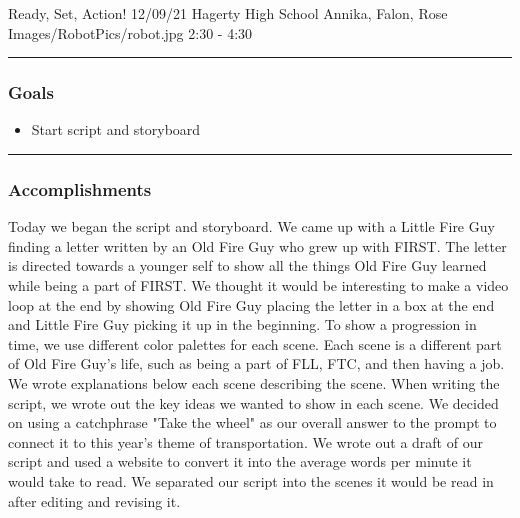 \insertmeeting 
	{Ready, Set, Action!} 
	{12/09/21} 
	{Hagerty High School}
	{Annika, Falon, Rose}
	{Images/RobotPics/robot.jpg}
	{2:30 - 4:30}
	
\noindent\hfil\rule{\textwidth}{.4pt}\hfil
\subsubsection*{Goals}
\begin{itemize}
    \item Start script and storyboard  

\end{itemize} 

\noindent\hfil\rule{\textwidth}{.4pt}\hfil

\subsubsection*{Accomplishments}
Today we began the script and storyboard. We came up with a Little Fire Guy finding a letter written by an Old Fire Guy who grew up with FIRST. The letter is directed towards a younger self to show all the things Old Fire Guy learned while being a part of FIRST. We thought it would be interesting to make a video loop at the end by showing Old Fire Guy placing the letter in a box at the end and Little Fire Guy picking it up in the beginning. To show a progression in time, we use different color palettes for each scene. Each scene is a different part of Old Fire Guy's life, such as being a part of FLL, FTC, and then having a job. We wrote explanations below each scene describing the scene. 
When writing the script, we wrote out the key ideas we wanted to show in each scene. We decided on using a catchphrase "Take the wheel" as our overall answer to the prompt to connect it to this year's theme of transportation. We wrote out a draft of our script and used a website to convert it into the average words per minute it would take to read. We separated our script into the scenes it would be read in after editing and revising it. 
 

